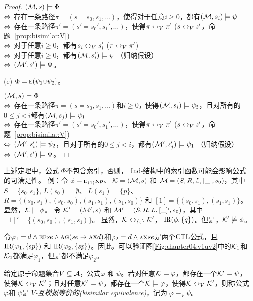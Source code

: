 \begin{proof}
	$({\cal M},s)\models \Phi$\\
	$\Leftrightarrow$ 存在一条路径$\pi=(s=s_0,s_1,\dots)$，使得对于任意$i\ge 0$，都有$({\cal M},s_i)\models \psi$\\
	$\Leftrightarrow$ 存在一条路径$\pi'=(s'=s_0',s_1',\dots)$，使得$\pi \leftrightarrow_V \pi'$ \hfill ($s \leftrightarrow_V s'$，命题~\ref{prop:bisimilar:V})\\
	$\Leftrightarrow$ 对于任意$i\ge 0$，都有$s_i \leftrightarrow_V s_i'$ \hfill ($\pi \leftrightarrow_V \pi'$)\\
	$\Leftrightarrow$ 对于任意$i\ge 0$，都有$({\cal M},s_i') \models \psi$ \hfill （归纳假设）\\
	$\Leftrightarrow$ $({\cal M}',s')\models \Phi$。
	
	(e) $\Phi = \textsc{e} (\psi_1 \textsc{u} \psi_2)$。
	
	$({\cal M},s) \models \Phi$\\
	$\Leftrightarrow$ 存在一条路径$\pi=(s=s_0,s_1,\dots)$和$i \ge 0$，使得$({\cal M},s_i) \models \psi_2$，且对所有的$0\leq j <i$都有$({\cal M},s_j)\models \psi_1$\\
	$\Leftrightarrow$ 存在一条路径$\pi'=(s'=s_0',s_1',\dots)$，使得$\pi \leftrightarrow_V \pi'$ \hfill ($s \leftrightarrow_V s'$，命题~\ref{prop:bisimilar:V})\\
	$\Leftrightarrow$ $({\cal M}',s_i') \models \psi_2$，且对于所有的$0\leq j <i$，都有$({\cal M}',s_j')\models \psi_1$  \hfill  （归纳假设）\\
	$\Leftrightarrow$ $({\cal M}',s')\models \Phi$。
\end{proof}

上述定理中，公式 $\Phi$不包含索引，否则， $\textrm{Ind}$-结构中的索引函数可能会影响公式的可满足性。
例：令 $\phi=\textsc{e}_{{\langle{1}\rangle}}\textsc{x} p$、
${\cal K}=({\cal M},s)$ 和 ${\cal M}=(S,R,L,[\_],s_0)$，其中 $S=\{s_0,s_1\}$, $L(s_0)=\emptyset$、 $L(s_1)=\{p\}$、
$R=\{(s_0,s_1),(s_0,s_0),(s_1,s_1), (s_1,s_0)\}$ 和 $[1]=\{(s_0,s_1), (s_1,s_1)\}$。显然，${\cal K}\models\phi$。
令 ${\cal K}'=({\cal M}',s)$ 和 ${\cal M}'=(S,R,L,[\_]',s_0)$，其中 $[1]'=\{(s_0,s_0),(s_1,s_1)\}$。
显然，${\cal K}\leftrightarrow_{\{q\}}{\cal K}'$， $\textrm{IR}(\phi,\{q\})$。但是，${\cal K}'\not\models\phi$。

\begin{example}
	令$\varphi_1 = d \wedge \textsc{e}\textsc{f} se \wedge \textsc{a}\textsc{g}(se \rightarrow \textsc{a}\textsc{x} d)$和$\varphi_2=d \wedge \textsc{a}\textsc{x} se$是两个$\textrm{CTL}$公式，且$\textrm{IR}(\varphi_1,\{sp\})$ 和 $\textrm{IR}(\varphi_2,\{sp\})$。因此，可以验证图\ref{Fig:chapter04:v1uv2}中的${\cal K}_1$和${\cal K}_2$都满足$\varphi_1$，但是都不满足$\varphi_2$。
\end{example}

\begin{definition}\label{def:bisimular:equivalene}
	给定原子命题集合$V\subseteq {\cal A}$，公式$\varphi$ 和 $\psi$。若对任意${\cal K}\models \varphi$，都存在一个${\cal K}'\models\psi$，使得${\cal K}\leftrightarrow_V{\cal K}'$；且对任意${\cal K}'\models\psi$，都存在一个${\cal K}\models \varphi$，使得${\cal K}\leftrightarrow_V{\cal K}'$，则称公式$\varphi$和 $\psi$是 {\em $V$-互模拟等价的(bisimilar equivalence)}，记为 $\varphi\equiv_V\psi$。
\end{definition}


